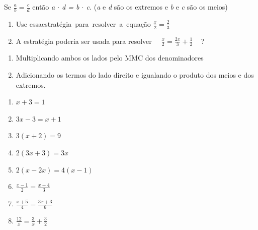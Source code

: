 \begin{exercicios}

Se \( \frac{a}{b}=\frac{c}{d} \) então  \textit{a $ \cdot $  d = b $ \cdot $  c. }(\textit{a }e \textit{d }são os extremos e\textit{ b }e\textit{ c }são os meios)

\begin{enumerate}[label=\alph*)]
	\item Use essaestratégia~para~resolver~a~equação \( \frac{x}{2}=\frac{2}{3} \)

	\item A estratégia poderia ser usada para resolver~~   \( \frac{x}{2}=\frac{2x}{3}+\frac{1}{2} \) ~ ?
\end{enumerate}


\begin{enumerate}
	\item Multiplicando ambos os lados pelo MMC dos denominadores

	\item Adicionando os termos do lado direito e igualando o produto dos meios e dos extremos.
\end{enumerate}


\begin{enumerate}
	\item  \( x + 3 = 1 \)

	\item  \( 3x-3=x+1 \)

	\item  \( 3 \left( x+2 \right) =9 \)

	\item  \( 2 \left( 3x+3 \right) =3x \)

	\item  \( 2 \left( x-2x \right) =4 \left( x-1 \right)   \)

	\item  \( \frac{x-1}{2}=\frac{x-4}{3} \)

	\item  \( \frac{x+5}{4}=\frac{3x+3}{6} \)

	\item  \( \frac{12}{x}=\frac{3}{x}+\frac{3}{2} \)


\end{enumerate}
\end{exercicios}
